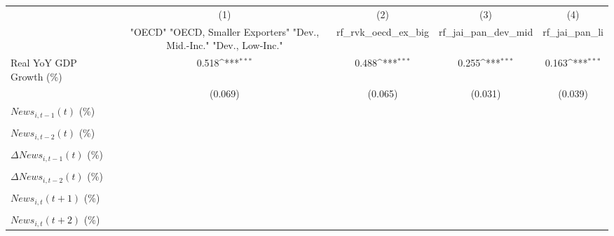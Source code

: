 {
\def\sym#1{\ifmmode^{#1}\else\(^{#1}\)\fi}
\begin{tabular}{l*{4}{c}}
\toprule
                    &\multicolumn{1}{c}{(1)}&\multicolumn{1}{c}{(2)}&\multicolumn{1}{c}{(3)}&\multicolumn{1}{c}{(4)}\\
                    &\multicolumn{1}{c}{ "OECD" "OECD, Smaller Exporters" "Dev., Mid.-Inc." "Dev., Low-Inc."}&\multicolumn{1}{c}{rf_rvk_oecd_ex_big}&\multicolumn{1}{c}{rf_jai_pan_dev_mid}&\multicolumn{1}{c}{rf_jai_pan_li}\\
\midrule
Real YoY GDP Growth (\%)&       0.518\sym{***}&       0.488\sym{***}&       0.255\sym{***}&       0.163\sym{***}\\
                    &     (0.069)         &     (0.065)         &     (0.031)         &     (0.039)         \\
\addlinespace
$ News_{i,t-1}(t)$ (\%)&                     &                     &                     &                     \\
                    &                     &                     &                     &                     \\
\addlinespace
$ News_{i,t-2}(t)$ (\%)&                     &                     &                     &                     \\
                    &                     &                     &                     &                     \\
\addlinespace
$ \Delta News_{i,t-1}(t)$ (\%)&                     &                     &                     &                     \\
                    &                     &                     &                     &                     \\
\addlinespace
$ \Delta News_{i,t-2}(t)$ (\%)&                     &                     &                     &                     \\
                    &                     &                     &                     &                     \\
\addlinespace
$ News_{i,t}(t+1)$ (\%)&                     &                     &                     &                     \\
                    &                     &                     &                     &                     \\
\addlinespace
$ News_{i,t}(t+2)$ (\%)&                     &                     &                     &                     \\

\end{tabular}}
